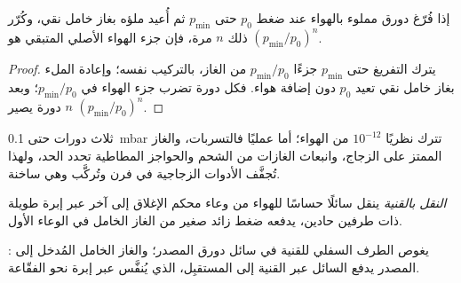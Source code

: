 \begin{proposition}\label{prop:b3:lab-techniques-3:purge-cycles}
إذا فُرّغ دورق مملوء بالهواء عند ضغط $p_0$ حتى $p_{\min}$ ثم أُعيد ملؤه
بغاز خامل نقي، وكُرّر ذلك $n$ مرة، فإن جزء الهواء الأصلي المتبقي هو $(p_{\min}/p_0)^n$.
\end{proposition}

\begin{proof}
يترك التفريغ حتى $p_{\min}$ جزءًا $p_{\min}/p_0$ من الغاز، بالتركيب نفسه؛ 
وإعادة الملء بغاز خامل نقي تعيد $p_0$ دون إضافة هواء. فكل دورة تضرب
جزء الهواء في $p_{\min}/p_0$؛ وبعد $n$ دورة يصير $(p_{\min}/p_0)^n$.
\end{proof}

ثلاث دورات حتى \qty{0.1}{mbar} تترك نظريًا $10^{-12}$ من الهواء؛ أما عمليًا فالتسربات، والغاز
الممتز على الزجاج، وانبعاث الغازات من الشحم والحواجز المطاطية تحدد الحد، 
ولهذا تُجفَّف الأدوات الزجاجية في فرن وتُركَّب وهي ساخنة.

\begin{definition}\label{def:b3:lab-techniques-3:cannula}
\emph{النقل بالقنية} ينقل سائلًا حساسًا للهواء
من وعاء محكم الإغلاق إلى آخر عبر إبرة طويلة ذات طرفين حادين، يدفعه
ضغط زائد صغير من الغاز الخامل في الوعاء الأول.
\end{definition}

\begin{omfigure}

{\small {}: يغوص الطرف السفلي للقنية في سائل
دورق المصدر؛ والغاز الخامل المُدخل إلى المصدر يدفع السائل عبر
القنية إلى المستقبِل، الذي يُنفَّس عبر إبرة نحو الفقّاعة.}
\end{omfigure}

